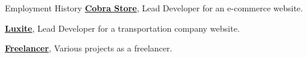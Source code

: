 \begin{rubric}{Employment History}
    \entry*[08/2023 -- 11/2023]%
    \textbf{\href{https://cobra-store.vercel.app}{Cobra Store}}, Lead Developer for an e-commerce website.

    \entry*[07/2023 -- 08/2023]%
    \textbf{\href{https://luxite.us}{Luxite}}, Lead Developer for a transportation company website.

    \entry*[08/2021 -- Present]%
    \textbf{\href{https://github.com/raideno}{Freelancer}}, Various projects as a freelancer.
\end{rubric}